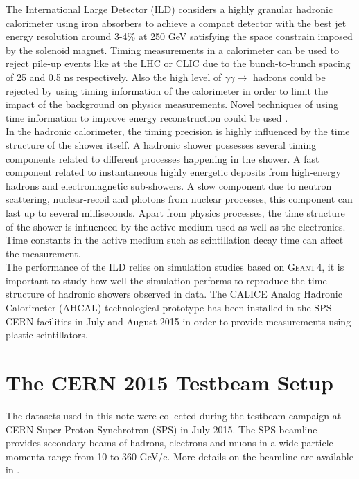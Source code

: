 \documentclass[twoside,a4paper,11pt]{article}
\newcommand\geant{\textsc{Geant\,4}\xspace}
\begin{document}
The International Large Detector (ILD) \cite{ILC_TDR} considers a highly granular hadronic calorimeter using iron absorbers to achieve a compact detector with the best jet energy resolution around 3-4\% at 250 GeV satisfying the space constrain imposed by the solenoid magnet. Timing measurements in a calorimeter can be used to reject pile-up events like at the LHC or CLIC due to the bunch-to-bunch spacing of 25 and 0.5 ns respectively. Also the high level of $\gamma\gamma \rightarrow$ hadrons could be rejected by using timing information of the calorimeter in order to limit the impact of the background on physics measurements. Novel techniques of using time information to improve energy reconstruction could be used \cite{IEEE_timing}.\\
In the hadronic calorimeter, the timing precision is highly influenced by the time structure of the shower itself. A hadronic shower possesses several timing components related to different processes happening in the shower. A fast component related to instantaneous highly energetic deposits from high-energy hadrons and electromagnetic sub-showers. A slow component due to neutron scattering, nuclear-recoil and photons from nuclear processes, this component can last up to several milliseconds. Apart from physics processes, the time structure of the shower is influenced by the active medium used as well as the electronics. Time constants in the active medium such as scintillation decay time can affect the measurement.\\
The performance of the ILD relies on simulation studies based on \geant, it is important to study how well the simulation performs to reproduce the time structure of hadronic showers observed in data. The CALICE Analog Hadronic Calorimeter (AHCAL) technological prototype has been installed in the SPS CERN facilities in July and August 2015 in order to provide measurements using plastic scintillators.

\section{The CERN 2015 Testbeam Setup}

The datasets used in this note were collected during the testbeam campaign at CERN Super Proton Synchrotron (SPS) in July 2015. The SPS beamline provides secondary beams of hadrons, electrons and muons in a wide particle momenta range from 10 to 360 GeV/c. More details on the beamline are available in \cite{SPSBeamLine}.
\end{document}
